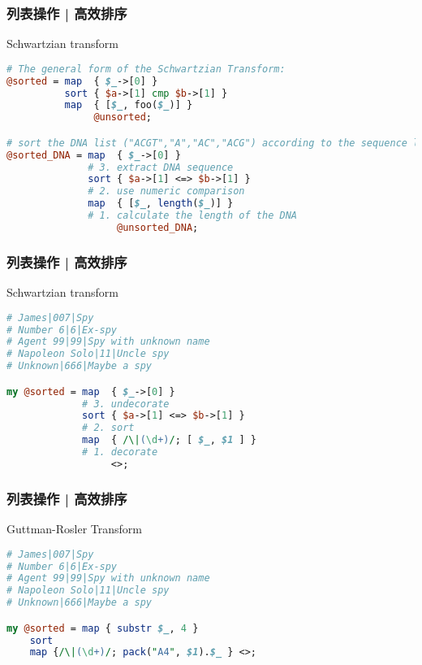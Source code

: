 \begin{frame}[fragile]
  \frametitle{列表操作 | 高效排序}
  \begin{block}{\alert{Schwartzian transform}}
\begin{lstlisting}[language=Perl,basicstyle=\small\tt]
# The general form of the Schwartzian Transform:
@sorted = map  { $_->[0] }
          sort { $a->[1] cmp $b->[1] }
          map  { [$_, foo($_)] }
               @unsorted;

# sort the DNA list ("ACGT","A","AC","ACG") according to the sequence length
@sorted_DNA = map  { $_->[0] }
              # 3. extract DNA sequence
              sort { $a->[1] <=> $b->[1] }
              # 2. use numeric comparison
              map  { [$_, length($_)] }
              # 1. calculate the length of the DNA
                   @unsorted_DNA;
\end{lstlisting}
  \end{block}
\end{frame}

\begin{frame}[fragile]
  \frametitle{列表操作 | 高效排序}
  \begin{block}{Schwartzian transform}
\begin{lstlisting}[language=Perl]
# James|007|Spy
# Number 6|6|Ex-spy
# Agent 99|99|Spy with unknown name
# Napoleon Solo|11|Uncle spy
# Unknown|666|Maybe a spy

my @sorted = map  { $_->[0] }
             # 3. undecorate
             sort { $a->[1] <=> $b->[1] }
             # 2. sort
             map  { /\|(\d+)/; [ $_, $1 ] }
             # 1. decorate
                  <>;
\end{lstlisting}
  \end{block}
\end{frame}

\begin{frame}[fragile]
  \frametitle{列表操作 | 高效排序}
  \begin{block}{Guttman-Rosler Transform}
\begin{lstlisting}[language=Perl]
# James|007|Spy
# Number 6|6|Ex-spy
# Agent 99|99|Spy with unknown name
# Napoleon Solo|11|Uncle spy
# Unknown|666|Maybe a spy

my @sorted = map { substr $_, 4 }
    sort
    map {/\|(\d+)/; pack("A4", $1).$_ } <>;
\end{lstlisting}
  \end{block}
\end{frame}

